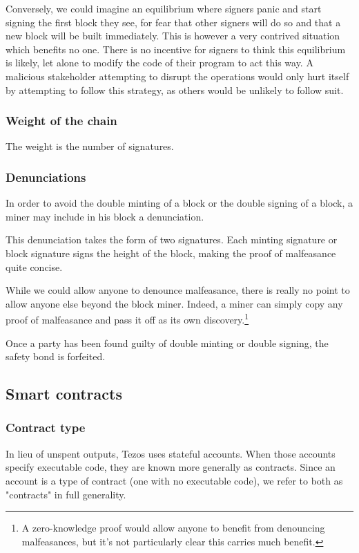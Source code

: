 \documentclass[letterpaper]{article}
\begin{document}
Conversely, we could imagine an equilibrium where signers panic and start
signing the first block they see, for fear that other signers will do so and
that a new block will be built immediately. This is however a very contrived
situation which benefits no one. There is no incentive for signers to think this
equilibrium is likely, let alone to modify the code of their program to act
this way. A malicious stakeholder attempting to disrupt the operations would only
hurt itself by attempting to follow this strategy, as others would be unlikely
to follow suit.

\subsubsection{Weight of the chain}

The weight is the number of signatures.


\subsubsection{Denunciations}
In order to avoid the double minting of a block or the double signing of a
block, a miner may include in his block a denunciation.

This denunciation takes the form of two signatures. Each minting signature
or block signature signs the height of the block, making the proof of malfeasance quite concise.

While we could allow anyone to denounce malfeasance, there is really no point to
allow anyone else beyond the block miner. Indeed, a miner can
simply copy any proof of malfeasance and pass it off as its own
discovery.\footnote{A zero-knowledge proof would allow anyone to benefit from
denouncing malfeasances, but it's not particularly clear this carries much
benefit.}

Once a party has been found guilty of double minting or double signing,
the safety bond is forfeited.


\subsection{Smart contracts}


\subsubsection{Contract type}
In lieu of unspent outputs, Tezos uses stateful accounts. When those
accounts specify executable code, they are known more generally as
contracts. Since an account is a type of contract (one with no
executable code), we refer to both as "contracts" in full generality.
\end{document}
